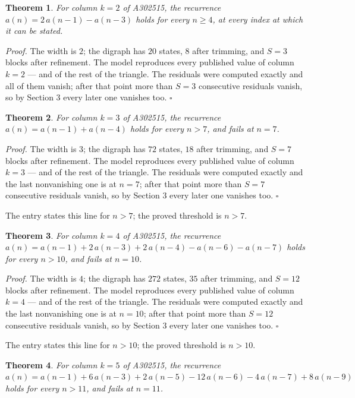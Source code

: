 \documentclass[11pt]{article}
\newtheorem{theorem}{Theorem}
\theoremstyle{definition}
\begin{document}
\begin{theorem} For column $k = 2$ of A302515, the recurrence $a(n) = 2\,a(n-1) - a(n-3)$ holds for every $n \ge 4$, at every index at which it can be stated.\end{theorem}

{\itshape Proof.} The width is $2$; the digraph has $20$ states, $8$ after trimming, and $S = 3$ blocks after refinement. The model reproduces every published value of column $k = 2$ --- and of the rest of the triangle. The residuals were computed exactly and all of them vanish; after that point more than $S = 3$ consecutive residuals vanish, so by Section 3 every later one vanishes too. $\square$

\begin{theorem} For column $k = 3$ of A302515, the recurrence $a(n) = a(n-1) + a(n-4)$ holds for every $n > 7$, and fails at $n = 7$.\end{theorem}

{\itshape Proof.} The width is $3$; the digraph has $72$ states, $18$ after trimming, and $S = 7$ blocks after refinement. The model reproduces every published value of column $k = 3$ --- and of the rest of the triangle. The residuals were computed exactly and the last nonvanishing one is at $n = 7$; after that point more than $S = 7$ consecutive residuals vanish, so by Section 3 every later one vanishes too. $\square$

The entry states this line for $n > 7$; the proved threshold is $n > 7$.

\begin{theorem} For column $k = 4$ of A302515, the recurrence $a(n) = a(n-1) + 2\,a(n-3) + 2\,a(n-4) - a(n-6) - a(n-7)$ holds for every $n > 10$, and fails at $n = 10$.\end{theorem}

{\itshape Proof.} The width is $4$; the digraph has $272$ states, $35$ after trimming, and $S = 12$ blocks after refinement. The model reproduces every published value of column $k = 4$ --- and of the rest of the triangle. The residuals were computed exactly and the last nonvanishing one is at $n = 10$; after that point more than $S = 12$ consecutive residuals vanish, so by Section 3 every later one vanishes too. $\square$

The entry states this line for $n > 10$; the proved threshold is $n > 10$.

\begin{theorem} For column $k = 5$ of A302515, the recurrence $a(n) = a(n-1) + 6\,a(n-3) + 2\,a(n-5) - 12\,a(n-6) - 4\,a(n-7) + 8\,a(n-9)$ holds for every $n > 11$, and fails at $n = 11$.\end{theorem}
\end{document}
